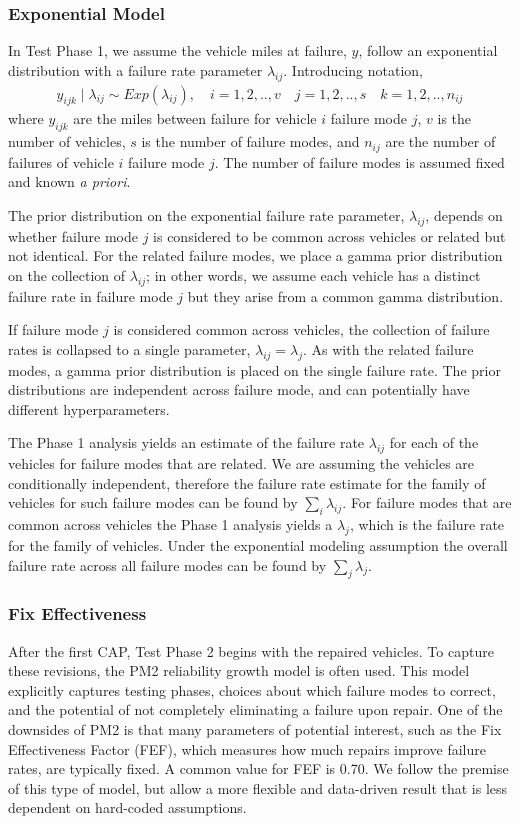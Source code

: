 \documentclass[12pt]{article}
\begin{document}
\subsubsection{Exponential Model}
In Test Phase 1, we assume the vehicle miles at failure, $y$, follow an
exponential distribution with a failure rate parameter $\lambda_{ij}$.
Introducing notation,
\begin{align}
y_{ijk}\mid\lambda_{ij}\sim Exp(\lambda_{ij}), \quad i = 1,2,..,v \quad j=1,2,..,s \quad k=1,2,..,n_{ij}
\end{align}
where $y_{ijk}$ are the miles between failure for vehicle $i$ failure mode $j$,
$v$ is the number of vehicles, $s$ is the number of failure modes, and $n_{ij}$
are the number of failures of vehicle $i$ failure mode $j$. The number of
failure modes is assumed fixed and known \textit{a priori}.

The prior distribution on the exponential failure rate parameter,
$\lambda_{ij}$, depends on whether failure mode $j$ is considered to be common
across vehicles or related but not identical. For the related failure modes,
we place a gamma prior distribution on the collection of $\lambda_{ij}$; in
other words, we assume each vehicle has a distinct failure rate in failure mode
$j$ but they arise from a common gamma distribution.

If failure mode $j$ is considered common across vehicles, the collection of
failure rates is collapsed to a single parameter, $\lambda_{ij} = \lambda_j$. As
with the related failure modes, a gamma prior distribution is placed on the
single failure rate. The prior distributions are independent across failure
mode, and can potentially have different hyperparameters.

The Phase 1 analysis yields an estimate of the failure rate $\lambda_{ij}$ for
each of the vehicles for failure modes that are related. We are assuming the
vehicles are conditionally independent, therefore the failure rate estimate for
the family of vehicles for such failure modes can be found by
$\sum_{i}\lambda_{ij}$. For failure modes that are common across vehicles the
Phase 1 analysis yields a $\lambda_{j}$, which is the failure rate for the
family of vehicles. Under the exponential modeling assumption the overall
failure rate across all failure modes can be found by $\sum_{j}\lambda_{j}$.

\subsubsection{Fix Effectiveness}
After the first CAP, Test Phase 2 begins with the repaired vehicles. To capture
these revisions, the PM2 reliability growth model \cite{EH06} is often used.
This model explicitly captures testing phases, choices about which failure modes
to correct, and the potential of not completely eliminating a failure upon
repair. One of the downsides of PM2 is that many parameters of potential
interest, such as the Fix Effectiveness Factor (FEF), which measures how much
repairs improve failure rates, are typically fixed. A common value for FEF is
0.70. We follow the premise of this type of model, but allow a more flexible and
data-driven result that is less dependent on hard-coded assumptions.
\end{document}
